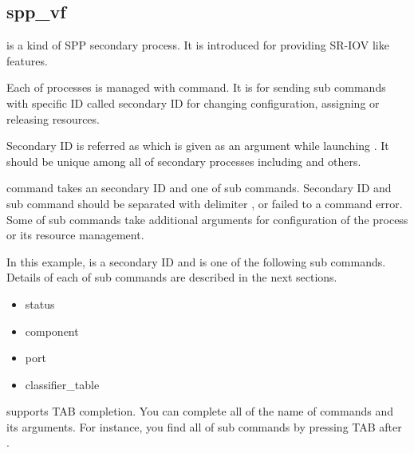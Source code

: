 \documentclass[a4paper,11pt,openany,oneside,english]{sphinxmanual}
\begin{document}
\subsection{spp\_vf}
\label{\detokenize{commands/secondary/spp_vf:spp-vf}}\label{\detokenize{commands/secondary/spp_vf:commands-spp-vf}}\label{\detokenize{commands/secondary/spp_vf::doc}}
 is a kind of SPP secondary process. It is introduced for
providing SR-IOV like features.

Each of  processes is managed with  command. It is for
sending sub commands with specific ID called secondary ID for changing
configuration, assigning or releasing resources.

Secondary ID is referred as  which is given as an argument
while launching . It should be unique among all of secondary
processes including  and others.

 command takes an secondary ID and one of sub commands. Secondary ID
and sub command should be separated with delimiter \sphinxcode{\sphinxupquote{;}}, or failed to a
command error. Some of sub commands take additional arguments for
configuration of the process or its resource management.

\begin{sphinxVerbatim}[commandchars=\\\{\},formatcom=\footnotesize]
\end{sphinxVerbatim}

In this example,  is a secondary ID and  is one of the
following sub commands. Details of each of sub commands are described in the
next sections.
\begin{itemize}
\item {} 
status

\item {} 
component

\item {} 
port

\item {} 
classifier\_table

\end{itemize}

 supports TAB completion. You can complete all of the name
of commands and its arguments. For instance, you find all of sub commands
by pressing TAB after .
\end{document}
